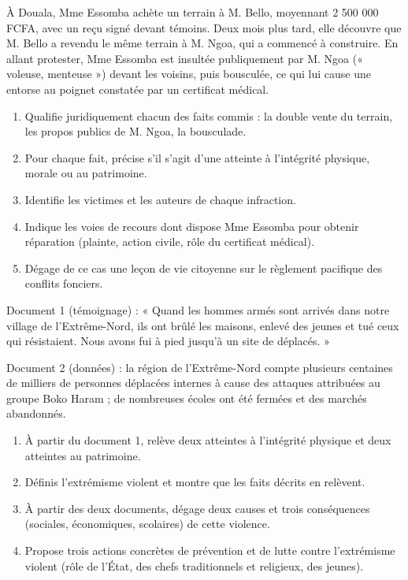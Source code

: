 \documentclass[11pt]{article}
\newcommand{\cle}[1]{{\popxbold\color{popdark}#1}}
\begin{document}
\begin{exercice}
À Douala, Mme Essomba achète un terrain à M. Bello, moyennant 2 500 000 FCFA, avec un reçu signé devant témoins. Deux mois plus tard, elle découvre que M. Bello a revendu le même terrain à M. Ngoa, qui a commencé à construire. En allant protester, Mme Essomba est insultée publiquement par M. Ngoa (« voleuse, menteuse ») devant les voisins, puis bousculée, ce qui lui cause une entorse au poignet constatée par un certificat médical.
\begin{enumerate}
\item Qualifie juridiquement chacun des faits commis : la double vente du terrain, les propos publics de M. Ngoa, la bousculade.
\item Pour chaque fait, précise s'il s'agit d'une atteinte à l'intégrité physique, morale ou au patrimoine.
\item Identifie les victimes et les auteurs de chaque infraction.
\item Indique les voies de recours dont dispose Mme Essomba pour obtenir réparation (plainte, action civile, rôle du certificat médical).
\item Dégage de ce cas une leçon de vie citoyenne sur le règlement pacifique des conflits fonciers.
\end{enumerate}
\end{exercice}

\begin{exercice}
Document 1 (témoignage) : « Quand les hommes armés sont arrivés dans notre village de l'Extrême-Nord, ils ont brûlé les maisons, enlevé des jeunes et tué ceux qui résistaient. Nous avons fui à pied jusqu'à un site de déplacés. »

Document 2 (données) : la région de l'Extrême-Nord compte plusieurs centaines de milliers de personnes déplacées internes à cause des attaques attribuées au groupe Boko Haram ; de nombreuses écoles ont été fermées et des marchés abandonnés.
\begin{enumerate}
\item À partir du document 1, relève deux atteintes à l'intégrité physique et deux atteintes au patrimoine.
\item Définis l'\cle{extrémisme violent} et montre que les faits décrits en relèvent.
\item À partir des deux documents, dégage deux causes et trois conséquences (sociales, économiques, scolaires) de cette violence.
\item Propose trois actions concrètes de prévention et de lutte contre l'extrémisme violent (rôle de l'État, des chefs traditionnels et religieux, des jeunes).
\end{enumerate}
\end{exercice}
\end{document}

